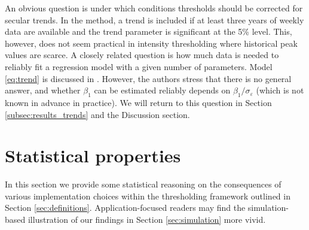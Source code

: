 \documentclass[12pt]{article}
\begin{document}
An obvious question is under which conditions thresholds should be corrected for secular trends. In the \cite{Farrington1996} method, a trend is included if at least three years of weekly data are available and the trend parameter is significant at the 5\% level. This, however, does not seem practical in intensity thresholding where historical peak values are scarce. A closely related question is how much data is needed to reliably fit a regression model with a given number of parameters. Model \eqref{eq:trend} is discussed in \cite{Hyndman2007}. However, the authors stress that there is no general answer, and whether $\beta_1$ can be estimated reliably depends on $\beta_1/\sigma_\varepsilon$ (which is not known in advance in practice). We will return to this question in Section \ref{subsec:results_trends} and the Discussion section.


 
\section{Statistical properties}
\label{sec:analytical_results}

In this section we provide some statistical reasoning on the consequences of various implementation choices within the thresholding framework outlined in Section \ref{sec:definitions}. Application-focused readers may find the simulation-based illustration of our findings in Section \ref{sec:simulation} more vivid. %
\end{document}

